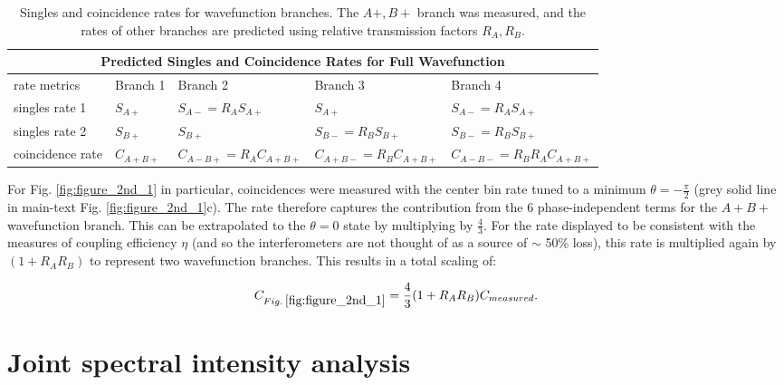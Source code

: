\documentclass[11pt]{caltech_thesis} %
\begin{document}
\begin{table}
\label{table:branches}
\begin{tabular}{ |p{2.5cm}||p{1.3cm}|p{2.9cm}|p{2.9cm}|p{3.4cm}|  }
\hline
\multicolumn{5}{|c|}{Predicted Singles and Coincidence Rates for Full Wavefunction} \\
\hline
rate metrics     &  Branch 1 & Branch 2 & Branch 3 & Branch 4 \label{table:rates}\\
\hline
singles rate 1  & $S_{A+}$ &$S_{A-}=R_A S_{A+}$    &$S_{A+}$               &$S_{A-}=R_A S_{A+}$        \\
singles rate 2  & $S_{B+}$ &$S_{B+}$               &$S_{B-} = R_B S_{B+}$  &$S_{B-} = R_B S_{B+}$      \\
coincidence rate&\textcolor{color1}{$C_{A+B+}$}&\textcolor{color3}{$C_{A-B+}=R_A C_{A+B+}$}&\textcolor{color2}{$C_{A+B-}=R_B C_{A+B+}$}&\textcolor{color4}{$C_{A-B-}=R_B R_A C_{A+B+}$}\\
\hline
\end{tabular}
\caption[{Rates for wavefunction branches}]{Singles and coincidence rates for wavefunction branches. The $A+, B+$ branch was measured, and the rates of other branches are predicted using relative transmission factors $R_A, R_B$.}
\end{table}

For Fig. \ref{fig:figure_2nd_1} in particular, coincidences were measured with the center bin rate tuned to a minimum $\theta=-\frac{\pi}{2}$ (grey solid line in main-text Fig. \ref{fig:figure_2nd_1}c). The rate therefore captures the contribution from the 6 phase-independent terms for the $A\!\!+\!\!B\!+\!$ wavefunction branch. This can be extrapolated to the $\theta=0$ state by multiplying by $\frac{4}{3}$. For the rate displayed to be consistent with the measures of coupling efficiency $\eta$ (and so the interferometers are not thought of as a source of $\sim$ 50\% loss), this rate is multiplied again by $(1 + R_AR_B)$ to represent two wavefunction branches. This results in a total scaling of:

$$C_{Fig. \: \ref{fig:figure_2nd_1}} = \frac{4}{3}(1 + R_AR_B)C_{measured}.$$

\hypertarget{joint-spectral-intensity-analysis}{%
\section{Joint spectral intensity analysis}\label{joint-spectral-intensity-analysis}}
\end{document}
